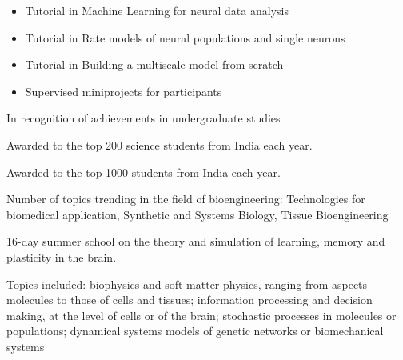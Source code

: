 \documentclass[10pt,a4paper]{altacv}
\begin{document}



\begin{itemize}
\item Tutorial in Machine Learning for neural data analysis 
\item Tutorial in Rate models of neural populations and single neurons
\item Tutorial in Building a multiscale model from scratch
\item Supervised miniprojects for participants
\end{itemize}


In recognition of achievements in undergraduate studies
\divider

Awarded to the top 200 science students from India each year.
\divider

Awarded to the top 1000 students from India each year.



Number of topics trending in the field of bioengineering: Technologies for biomedical application, Synthetic and Systems Biology, Tissue Bioengineering



16-day summer school on the theory and simulation of learning, memory and plasticity in the brain.

Topics included: biophysics and soft-matter physics, ranging from aspects molecules to those of cells and tissues; information processing and decision making, at the level of cells or of the brain; stochastic processes in molecules or populations; dynamical systems models of genetic networks or biomechanical systems

\end{document}
